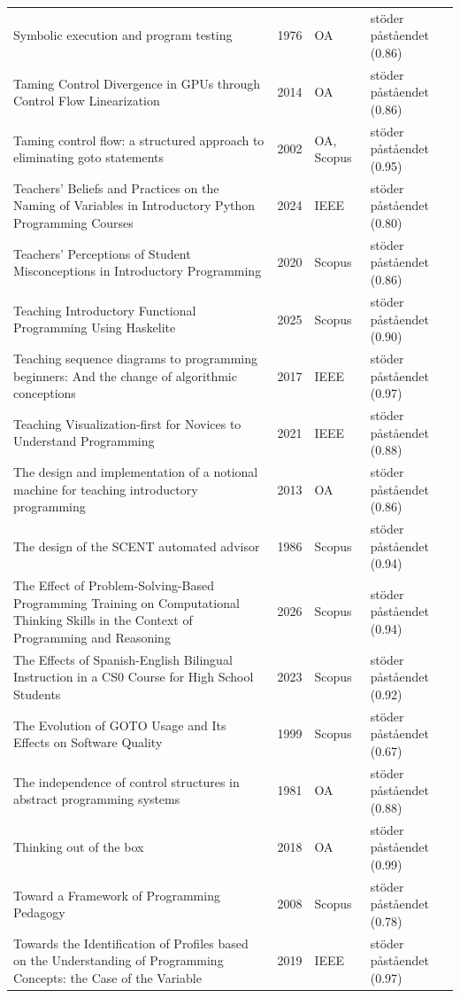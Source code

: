 \begin{longtable}{@{}%
  >{\raggedright\arraybackslash}p{}c%
  >{\raggedright\arraybackslash}p{}%
  >{\raggedright\arraybackslash}p{}@{}}
Symbolic execution and program testing & 1976 & OA & stöder påståendet (0.86) \\
Taming Control Divergence in GPUs through Control Flow Linearization & 2014 & OA & stöder påståendet (0.86) \\
Taming control flow: a structured approach to eliminating goto statements & 2002 & OA, Scopus & stöder påståendet (0.95) \\
Teachers' Beliefs and Practices on the Naming of Variables in Introductory Python Programming Courses & 2024 & IEEE & stöder påståendet (0.80) \\
Teachers' Perceptions of Student Misconceptions in Introductory Programming & 2020 & Scopus & stöder påståendet (0.86) \\
Teaching Introductory Functional Programming Using Haskelite & 2025 & Scopus & stöder påståendet (0.90) \\
Teaching sequence diagrams to programming beginners: And the change of algorithmic conceptions & 2017 & IEEE & stöder påståendet (0.97) \\
Teaching Visualization-first for Novices to Understand Programming & 2021 & IEEE & stöder påståendet (0.88) \\
The design and implementation of a notional machine for teaching introductory programming & 2013 & OA & stöder påståendet (0.86) \\
The design of the SCENT automated advisor & 1986 & Scopus & stöder påståendet (0.94) \\
The Effect of Problem-Solving-Based Programming Training on Computational Thinking Skills in the Context of Programming and Reasoning & 2026 & Scopus & stöder påståendet (0.94) \\
The Effects of Spanish-English Bilingual Instruction in a CS0 Course for High School Students & 2023 & Scopus & stöder påståendet (0.92) \\
The Evolution of GOTO Usage and Its Effects on Software Quality & 1999 & Scopus & stöder påståendet (0.67) \\
The independence of control structures in abstract programming systems & 1981 & OA & stöder påståendet (0.88) \\
Thinking out of the box & 2018 & OA & stöder påståendet (0.99) \\
Toward a Framework of Programming Pedagogy & 2008 & Scopus & stöder påståendet (0.78) \\
Towards the Identification of Profiles based on the Understanding of Programming Concepts: the Case of the Variable & 2019 & IEEE & stöder påståendet (0.97) \\

\end{longtable}
